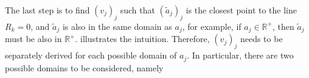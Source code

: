 


The last step is to find $(v_j)_j$ such that $(\tilde{a}_j)_j$ is the closest point to the line $R_k=0$, and $\tilde{a}_j$ is also in the same domain as $a_j$, for example, if $a_j \in \mathbb{R}^+$, then $\tilde{a}_j$ must be also in $\mathbb{R}^+$. \addfigure{\ref{fig:dtd_rule_cases}} illustrates the intuition.  Therefore, $(v_j)_j$ needs to be separately derived for each possible domain of $a_j$. In particular, there are two possible domains to be considered, namely 
%

\begin{figure}
\centering

     \hfill
{}

\label{fig:dtd_rule_cases}
\end{figure}


%
%

